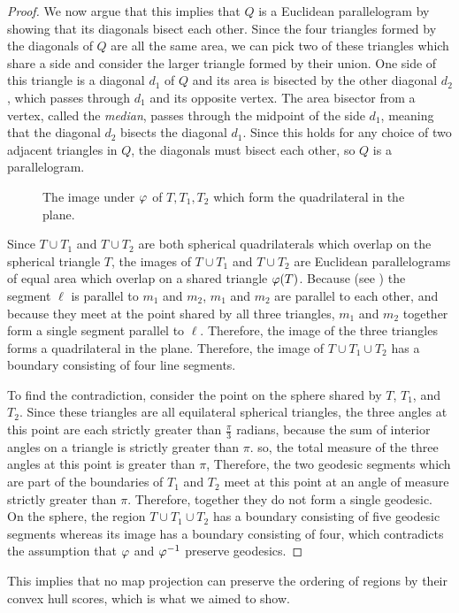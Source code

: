 \begin{proof}
		We now argue that this implies that $Q$ is a Euclidean parallelogram by showing that its diagonals bisect each other.  Since the four triangles 
		formed by the diagonals of $Q$ are all the same area, we can pick two of these triangles which share a side 
		and consider the larger triangle formed by their union.  One side of this triangle is a diagonal $d_1$ of $Q$ and its area is 
		bisected by the other diagonal $d_2$, which passes through $d_1$ and its opposite vertex.  The area bisector from a vertex, called the \textit{median}, passes through the midpoint of the side $d_1$, meaning that the diagonal $d_2$ bisects the diagonal $d_1$.  Since this holds for any choice of two adjacent triangles in $Q$, the diagonals must bisect each other, so $Q$ is a parallelogram.
		
		\begin{figure}[h]
			\centering
			
			\caption{The image under $\varphi$ of $T,T_1,T_2$ which form the quadrilateral in the plane.}
			\label{fig:sphtris_pl}
		\end{figure}
		

Since $T\cup T_1$ and $T\cup T_2$ are both spherical quadrilaterals which overlap on the spherical triangle $T$, the images of $T\cup T_1$ and $T\cup T_2$ are Euclidean parallelograms of equal area which overlap on a shared triangle $\varphi(T)$.  Because  (see ) the segment $\ell$ is parallel to $m_1$ and $m_2$, $m_1$ and $m_2$ are parallel to each other, and because they meet at the point shared by all three triangles, $m_1$ and $m_2$ together form a single segment parallel to $\ell$.  Therefore, the image of the three triangles forms a quadrilateral in the plane.
	Therefore, the image of $T\cup T_1\cup T_2$ has a boundary consisting of 
	four line segments.
	
	To find the contradiction, consider the point on the sphere shared by $T$, $T_1$, and $T_2$.  Since these triangles are all equilateral spherical triangles, the three angles at this point are each strictly greater than $\tfrac{\pi}{3}$ radians, because the sum of interior angles on a triangle is strictly greater than $\pi$.  
	so, the total measure of the three angles at this point is greater than $\pi$,  Therefore, the two geodesic segments which are part of the boundaries of $T_1$ and $T_2$ meet at this point at an angle of measure strictly greater than 
	$\pi$. Therefore, together they do not form a single geodesic.  On the sphere, the region $T\cup T_1\cup T_2$ has a boundary consisting of five geodesic segments whereas its image has a boundary consisting of four, which contradicts the assumption that $\varphi$ and $\varphi^{-1}$ preserve geodesics.
\end{proof}

This implies that no map projection can preserve the ordering of regions by their convex hull scores, which is what we aimed to show.

